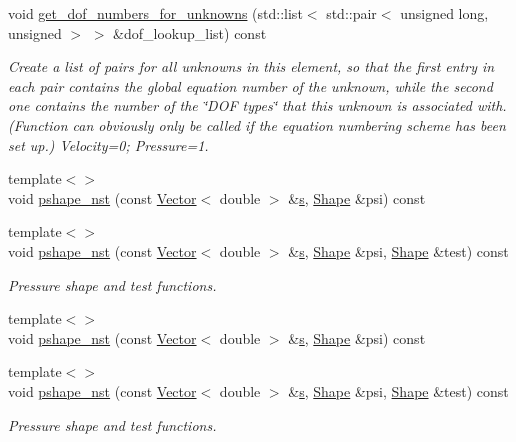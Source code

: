 \begin{DoxyCompactItemize}
void \hyperlink{classoomph_1_1TCrouzeixRaviartElement_a517601fb2fa71851b6d2a84a1fb45ce8}{get\+\_\+dof\+\_\+numbers\+\_\+for\+\_\+unknowns} (std\+::list$<$ std\+::pair$<$ unsigned long, unsigned $>$ $>$ \&dof\+\_\+lookup\+\_\+list) const
\begin{DoxyCompactList}\small\item\em Create a list of pairs for all unknowns in this element, so that the first entry in each pair contains the global equation number of the unknown, while the second one contains the number of the \char`\"{}\+D\+O\+F types\char`\"{} that this unknown is associated with. (Function can obviously only be called if the equation numbering scheme has been set up.) Velocity=0; Pressure=1. \end{DoxyCompactList}\item 
{\footnotesize template$<$$>$ }\\void \hyperlink{classoomph_1_1TCrouzeixRaviartElement_a70b147d8e7790e037d418b703ba4dc31}{pshape\+\_\+nst} (const \hyperlink{classoomph_1_1Vector}{Vector}$<$ double $>$ \&\hyperlink{cfortran_8h_ab7123126e4885ef647dd9c6e3807a21c}{s}, \hyperlink{classoomph_1_1Shape}{Shape} \&psi) const
\item 
{\footnotesize template$<$$>$ }\\void \hyperlink{classoomph_1_1TCrouzeixRaviartElement_aaf075113ef6d32642ec9d482a961ebdc}{pshape\+\_\+nst} (const \hyperlink{classoomph_1_1Vector}{Vector}$<$ double $>$ \&\hyperlink{cfortran_8h_ab7123126e4885ef647dd9c6e3807a21c}{s}, \hyperlink{classoomph_1_1Shape}{Shape} \&psi, \hyperlink{classoomph_1_1Shape}{Shape} \&test) const
\begin{DoxyCompactList}\small\item\em Pressure shape and test functions. \end{DoxyCompactList}\item 
{\footnotesize template$<$$>$ }\\void \hyperlink{classoomph_1_1TCrouzeixRaviartElement_a00b50ccb04f8c64a3764e0cb022a1475}{pshape\+\_\+nst} (const \hyperlink{classoomph_1_1Vector}{Vector}$<$ double $>$ \&\hyperlink{cfortran_8h_ab7123126e4885ef647dd9c6e3807a21c}{s}, \hyperlink{classoomph_1_1Shape}{Shape} \&psi) const
\item 
{\footnotesize template$<$$>$ }\\void \hyperlink{classoomph_1_1TCrouzeixRaviartElement_a0d100edb0d0d192db74418881765fa73}{pshape\+\_\+nst} (const \hyperlink{classoomph_1_1Vector}{Vector}$<$ double $>$ \&\hyperlink{cfortran_8h_ab7123126e4885ef647dd9c6e3807a21c}{s}, \hyperlink{classoomph_1_1Shape}{Shape} \&psi, \hyperlink{classoomph_1_1Shape}{Shape} \&test) const
\begin{DoxyCompactList}\small\item\em Pressure shape and test functions. \end{DoxyCompactList}\end{DoxyCompactItemize}
